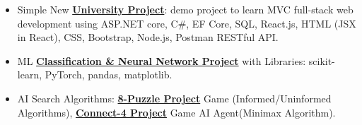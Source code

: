 \begin{itemize}[itemsep=0pt, parsep=0pt, topsep=0pt]
  \item {\footnotesize Simple New \textbf{\textcolor{cyan}{\href{https://github.com/AsmaaJAH/simple-university-fullstack-web-project/tree/feature/apply_page}{ University Project}}}: demo project to learn MVC full-stack web development using ASP.NET core, C\#, EF Core, SQL, React.js, HTML (JSX in React), CSS, Bootstrap, Node.js, Postman RESTful API.}
 \end{itemize}



\begin{itemize}[itemsep=0pt, parsep=0pt, topsep=0pt]
  \item{ \footnotesize ML \textbf{\textcolor{cyan}{\href{https://github.com/AsmaaJAH/Data-classifications-and-Neural-Network-using-random-data}{Classification \& Neural Network Project}}} with Libraries: scikit-learn, PyTorch, pandas, matplotlib. }
  \item {\footnotesize AI Search Algorithms: \textbf{\textcolor{cyan}{\href{https://github.com/AsmaaJAH/8_puzzle}{8-Puzzle Project}}} Game (Informed/Uninformed Algorithms), \textbf{\textcolor{cyan}{\href{https://github.com/AsmaaJAH/Connect-4-AI-Agent}{Connect-4 Project}}} Game AI Agent(Minimax Algorithm).}
 \end{itemize}


